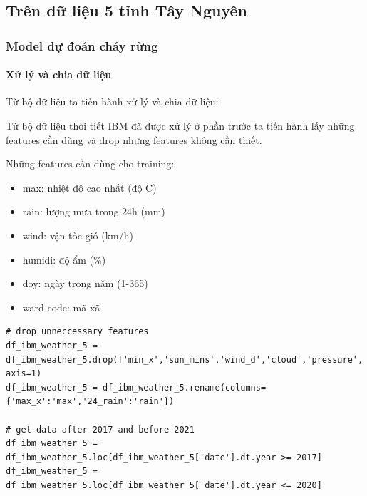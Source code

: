 \documentclass{article}
\begin{document}

\subsection{Trên dữ liệu 5 tỉnh Tây Nguyên}
\subsubsection{Model dự đoán cháy rừng}
\paragraph{Xử lý và chia dữ liệu}

Từ bộ dữ liệu ta tiến hành xử lý và chia dữ liệu:

Từ bộ dữ liệu thời tiết IBM đã được xử lý ở phần trước ta tiến hành lấy những features cần dùng và drop những features không cần thiết.

Những features cần dùng cho training:
\begin{itemize}
    \item max: nhiệt độ cao nhất (độ C)
	\item rain: lượng mưa trong 24h (mm)
	\item wind: vận tốc gió (km/h)
	\item humidi: độ ẩm (\%)
	\item doy: ngày trong năm (1-365)
	\item ward code: mã xã
\end{itemize}

\begin{verbatim}
# drop unneccessary features
df_ibm_weather_5 = df_ibm_weather_5.drop(['min_x','sun_mins','wind_d','cloud','pressure','sunset','sunrise','7_rain','m_rain','province','max_y','min_y','rain'], axis=1)
df_ibm_weather_5 = df_ibm_weather_5.rename(columns={'max_x':'max','24_rain':'rain'})

# get data after 2017 and before 2021
df_ibm_weather_5 = df_ibm_weather_5.loc[df_ibm_weather_5['date'].dt.year >= 2017]
df_ibm_weather_5 = df_ibm_weather_5.loc[df_ibm_weather_5['date'].dt.year <= 2020]
\end{verbatim}
\end{document}
